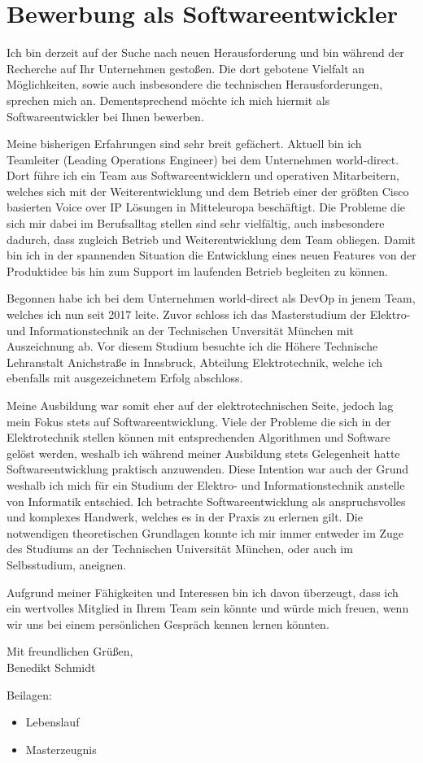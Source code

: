\section*{Bewerbung als Softwareentwickler}
Ich bin derzeit auf der Suche nach neuen Herausforderung und bin während der Recherche auf Ihr Unternehmen gestoßen. Die dort gebotene Vielfalt an Möglichkeiten, sowie auch insbesondere die technischen Herausforderungen, sprechen mich an. Dementsprechend möchte ich mich hiermit als Softwareentwickler bei Ihnen bewerben. \par
Meine bisherigen Erfahrungen sind sehr breit gefächert. Aktuell bin ich Teamleiter (Leading Operations Engineer) bei dem Unternehmen world-direct. Dort führe ich ein Team aus Softwareentwicklern und operativen Mitarbeitern, welches sich mit der Weiterentwicklung und dem Betrieb einer der größten Cisco basierten Voice over IP Lösungen in Mitteleuropa beschäftigt. Die Probleme die sich mir dabei im Berufsalltag stellen sind sehr vielfältig, auch insbesondere dadurch, dass zugleich Betrieb und Weiterentwicklung dem Team obliegen. Damit bin ich in der spannenden Situation die Entwicklung eines neuen Features von der Produktidee bis hin zum Support im laufenden Betrieb begleiten zu können. \par
Begonnen habe ich bei dem Unternehmen world-direct als DevOp in jenem Team, welches ich nun seit 2017 leite. Zuvor schloss ich das Masterstudium der Elektro- und Informationstechnik an der Technischen Unversität München mit Auszeichnung ab. Vor diesem Studium besuchte ich die Höhere Technische Lehranstalt Anichstraße in Innsbruck, Abteilung Elektrotechnik, welche ich ebenfalls mit ausgezeichnetem Erfolg abschloss. \par
Meine Ausbildung war somit eher auf der elektrotechnischen Seite, jedoch lag mein Fokus stets auf Softwareentwicklung. Viele der Probleme die sich in der Elektrotechnik stellen können mit entsprechenden Algorithmen und Software gelöst werden, weshalb ich während meiner Ausbildung stets Gelegenheit hatte Softwareentwicklung praktisch anzuwenden. Diese Intention war auch der Grund weshalb ich mich für ein Studium der Elektro- und Informationstechnik anstelle von Informatik entschied. Ich betrachte Softwareentwicklung als anspruchsvolles und komplexes Handwerk, welches es in der Praxis zu erlernen gilt. Die notwendigen theoretischen Grundlagen konnte ich mir immer entweder im Zuge des Studiums an der Technischen Universität München, oder auch im Selbsstudium, aneignen. \par
Aufgrund meiner Fähigkeiten und Interessen bin ich davon überzeugt, dass ich ein wertvolles Mitglied in Ihrem Team sein könnte und würde mich freuen, wenn wir uns bei einem persönlichen Gespräch kennen lernen könnten. \par
\vspace{0.5cm}
\indent Mit freundlichen Grüßen, \\
\indent Benedikt Schmidt \par
\vspace{0.5cm}
Beilagen:
\begin{itemize}
	\item Lebenslauf
	\item Masterzeugnis
\end{itemize}
